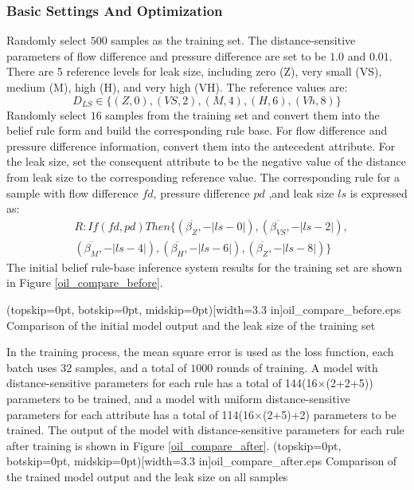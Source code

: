 \documentclass{ieeeaccess}
\begin{document}
\subsubsection{Basic Settings And Optimization}
Randomly select $500$ samples as the training set.
The distance-sensitive parameters of flow difference and pressure difference are set to be $1.0$ and $0.01$.
There are 5 reference levels for leak size, including zero (Z), very small (VS), medium (M), high (H), and very high (VH).
The reference values are:
\begin{equation}
    D_{LS}\in \{(Z,0),(VS,2),(M,4),(H,6),(Vh,8)\}
\end{equation}
Randomly select $16$ samples from the training set and convert them into the belief rule form and build the corresponding rule base.
For flow difference and pressure difference information, convert them into the antecedent attribute.
For the leak size, set the consequent attribute to be the negative value of the distance from leak size to the corresponding reference value.
The corresponding rule for a sample with flow difference $fd$, pressure difference $pd$ ,and leak size $ls$ is expressed as:
\begin{equation}
    \begin{split}
        &R:If(fd,pd)Then\{(\overline{\beta_{Z}},-|ls-0|),(\overline{\beta_{VS}},-|ls-2|),\\
        &(\overline{\beta_{M}},-|ls-4|),(\overline{\beta_{H}},-|ls-6|),(\overline{\beta_{Z}},-|ls-8|)\}
    \end{split}
\end{equation}
The initial belief rule-base inference system results for the training set are shown in Figure \ref{oil_compare_before}.

\Figure[!t](topskip=0pt, botskip=0pt, midskip=0pt)[width=3.3 in]{oil_compare_before.eps}
{Comparison of the initial model output and the leak size of the training set\label{oil_compare_before}}

In the training process, the mean square error is used as the loss function, each batch uses $32$ samples, and a total of $1000$ rounds of training.
A model with distance-sensitive parameters for each rule has a total of 144(16$\times$(2+2+5)) parameters to be trained,
and a model with uniform distance-sensitive parameters for each attribute has a total of 114(16$\times$(2+5)+2) parameters to be trained.
The output of the model with distance-sensitive parameters for each rule after training is shown in Figure \ref{oil_compare_after}.
\Figure[!t](topskip=0pt, botskip=0pt, midskip=0pt)[width=3.3 in]{oil_compare_after.eps}
{Comparison of the trained model output and the leak size on all samples\label{oil_compare_after}}
\end{document}
